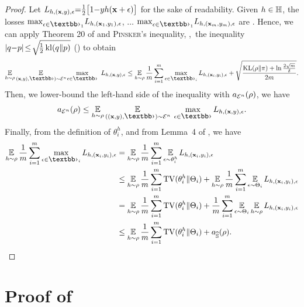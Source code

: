 \begin{noaddcontents}
\theoremboundaveragemax*
\begin{proof}
\newcommand{\Loss}[1]{L_{#1}}
Let $\Loss{\h{,}(\x{,}\y){,}\epsilon}{=}\frac{1}{2}\big[1{-}\y\h(\x+\epsilon)\big]$ for the sake of readability.
Given $h\in\mathbb{H}$, the losses $\max_{\epsilon\in\Epert_1}\!\Loss{\h{,} (\x_1{,}\y_1){,} \epsilon}$, $\ldots$ $\max_{\epsilon\in\Epert_1}\!\Loss{\h{,} (\x_m{,}\y_m){,} \epsilon}$ are \iid.
Hence, we can apply Theorem 20 of \citet{GermainLacasseLavioletteMarchandRoy2015} and \textsc{Pinsker}'s inequality, \ie,\ the inequality $|q{-}p|\! \le\! \sqrt{\!\frac{1}{2}\operatorname{kl}(q\|p)}$ () to obtain
\begin{align*}
    \EE_{\h\sim\Q}\EE_{(\x,\y),\Epert) \sim\Dpert^{n\!}} \max_{\epsilon\in\Epert}\ \Loss{\h{,}(\x{,}\y){,}\epsilon}
  \le \EE_{\h\sim\Q}\frac{1}{\m}\sum_{i=1}^{\m}\max_{\epsilon\in\Epert_i}\Loss{\h{,}(\x_i{,}\y_i){,}\epsilon} +
  \sqrt{\frac{\KL(\Q\|\P)+\ln\tfrac{2\sqrt{\m}}{\delta}}{2\m}}.
\end{align*}
Then, we lower-bound the left-hand side of the inequality with $a_{{\mathcal{E}}^{n}}(\rho)$, we have
\begin{align*}
   \RiskMS_{\Dpert^{n}}(\Q) \le \EE_{\h\sim\Q} \EE_{( (\x,\y),\Epert)\sim\Dpert^{n\!}}\ \max_{\epsilon\in\Epert}\Loss{\h, (\x,\y),\epsilon}.
\end{align*}
Finally, from the definition of $\theta_i^h$, and from Lemma~4 of \citet{OhnishiHonorio2021}, we have
\begin{align*}
    \EE_{\h\sim\Q}\frac{1}{\m}\sum_{i=1}^{\m}\max_{\epsilon\in\Epert_i}\Loss{\h{,}(\x_i{,}\y_i){,}\epsilon}
    &=  \EE_{\h\sim\Q}\frac{1}{\m}\sum_{i=1}^{\m}\EE_{\epsilon\sim\theta_i^{\h}}\Loss{\h{,}(\x_i{,}\y_i){,}\epsilon}\\
    &\le \EE_{\h\sim\Q}\frac{1}{\m}\sum_{i=1}^{\m}\TV(\theta_i^\h\|\Theta_i) + \EE_{\h\sim\Q}\frac{1}{\m}\sum_{i=1}^{\m}\EE_{\epsilon\sim\Theta_i}\Loss{\h{,}(\x_i{,}\y_i){,}\epsilon}\\
    &= \EE_{\h\sim\Q}\frac{1}{\m}\sum_{i=1}^{\m}\TV(\theta_i^\h\|\Theta_i) + \frac{1}{\m}\sum_{i=1}^{\m}\EE_{\epsilon\sim\Theta_i}\EE_{\h\sim\Q}\Loss{\h{,}(\x_i{,}\y_i){,}\epsilon}\\
    &\le \EE_{\h\sim\Q}\frac{1}{\m}\sum_{i=1}^{\m}\TV(\theta_i^\h\|\Theta_i) + \RiskMS_{\Spert}(\Q).
\end{align*}
\end{proof}

\section{Proof of }
\label{ap:mv-robustness:sec:proof-bound}


\end{noaddcontents}
